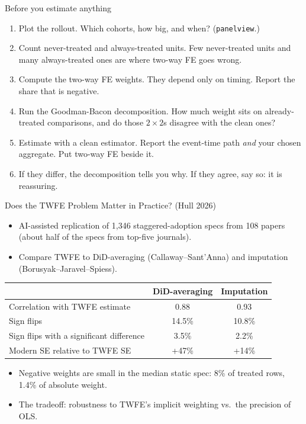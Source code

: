 \documentclass[aspectratio=169,11pt]{beamer}
\begin{document}
\begin{frame}{Before you estimate anything}
\begin{enumerate}
	\item \alert{Plot the rollout.} Which cohorts, how big, and when? (\texttt{panelview}.)
	\item \alert{Count} never-treated and always-treated units. Few never-treated units and many always-treated ones are where
	two-way FE goes wrong.
	\item \alert{Compute the two-way FE weights.} They depend only on timing. Report the share that is negative.
	\item \alert{Run the Goodman-Bacon decomposition.} How much weight sits on already-treated comparisons, and do those
	$2\times2$s disagree with the clean ones?
	\item Estimate with a clean estimator. Report the event-time path \emph{and} your chosen aggregate. Put two-way FE beside it.
	\item If they differ, the decomposition tells you why. If they agree, say so: it is reassuring.
\end{enumerate}
\end{frame}


\begin{frame}{Does the TWFE Problem Matter in Practice? (Hull 2026)}
\footnotesize
\begin{itemize}
\item AI-assisted replication of 1,346 staggered-adoption specs from 108 papers (about half of the specs from top-five journals).
\item Compare TWFE to DiD-averaging (Callaway--Sant'Anna) and imputation (Borusyak--Jaravel--Spiess).
\end{itemize}
\smallskip
\begin{center}
\begin{tabular}{lcc}
\toprule
 & DiD-averaging & Imputation \\
\midrule
Correlation with TWFE estimate & 0.88 & 0.93 \\
Sign flips & 14.5\% & 10.8\% \\
Sign flips with a significant difference & 3.5\% & 2.2\% \\
Modern SE relative to TWFE SE & +47\% & +14\% \\
\bottomrule
\end{tabular}
\end{center}
\smallskip
\begin{itemize}
\item Negative weights are small in the median static spec: 8\% of treated rows, 1.4\% of absolute weight.
\item The tradeoff: robustness to TWFE's implicit weighting vs.\ the precision of OLS.
\end{itemize}
\end{frame}
\end{document}
